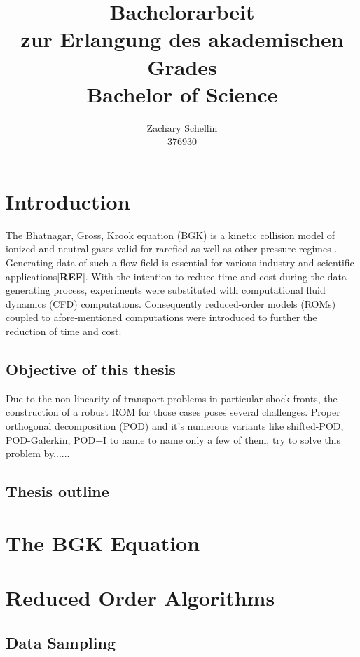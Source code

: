 \documentclass[12pt, a4paper]{article}
\begin{document}
\title{Bachelorarbeit\\ zur Erlangung des akademischen Grades\\ Bachelor of Science}
\author{Zachary Schellin\\376930}

\maketitle
\tableofcontents
\section{Introduction}
The Bhatnagar, Gross, Krook equation (BGK) is a kinetic collision model of ionized and neutral gases valid for rarefied as well as other pressure regimes \cite{BGK}. Generating data of such a flow field is essential for various industry and scientific applications[\textbf{REF}]. With the intention to reduce time and cost during the data generating process, experiments were substituted with computational fluid dynamics (CFD) computations. Consequently reduced-order models (ROMs) coupled to afore-mentioned computations were introduced to further the reduction of time and cost. 
\subsection{Objective of this thesis}
Due to the non-linearity of transport problems in particular shock fronts, the construction of a robust ROM for those cases poses several challenges. Proper orthogonal decomposition (POD) and it's numerous variants like shifted-POD\cite{bibid}, POD-Galerkin\cite{bibid}, POD+I \cite{bibid} to name to name only a few of them, try to solve this problem by......
\subsection{Thesis outline}
\section{The BGK Equation}
\section{Reduced Order Algorithms}
\subsection{Data Sampling}
\end{document}
